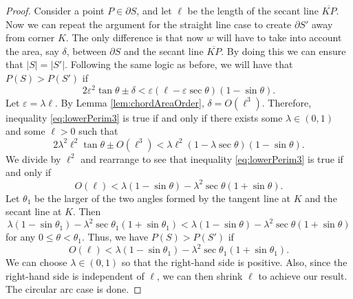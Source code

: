 \documentclass[10pt,a4paper]{amsart}
\begin{document}
\begin{proof}
    Consider a point $P \in \partial S$, and let $\ell$ be the length of the secant line $\overline{KP}$. Now we can repeat the argument for the straight line case to create $\partial S'$ away from corner $K$. The only difference is that now $w$ will have to take into account the area, say $\delta$, between $\partial S$ and the secant line $\overline{KP}$. By doing this we can ensure that $|S| = |S'|$. Following the same logic as before, we will have that $P(S) > P(S')$ if
    \begin{equation}\label{eq:lowerPerim3}
        2\varepsilon^2\tan\theta  \pm \delta < \varepsilon(\ell - \varepsilon\sec\theta)(1-\sin\theta).
    \end{equation}
    Let $\varepsilon = \lambda \ell$. By Lemma \ref{lem:chordAreaOrder}, $\delta = O(\ell^3)$. Therefore, inequality \eqref{eq:lowerPerim3} is true if and only if there exists some $\lambda \in (0,1)$ and some $\ell > 0$ such that
    \[
        2\lambda^2\ell^2\tan\theta  \pm O(\ell^3) < \lambda\ell^2(1 - \lambda\sec\theta)(1-\sin\theta).
    \]
    We divide by $\ell^2$ and rearrange to see that inequality \eqref{eq:lowerPerim3} is true if and only if
    \[
        O(\ell) < \lambda(1-\sin\theta) - \lambda^2\sec\theta(1+\sin\theta).
    \]
    Let $\theta_{1}$ be the larger of the two angles formed by the tangent line at $K$ and the secant line at $K$. Then
    \[
        \lambda(1-\sin\theta_{1}) - \lambda^2\sec\theta_{1}(1+\sin\theta_{1}) < \lambda(1-\sin\theta) - \lambda^2\sec\theta(1+\sin\theta)
    \]
 for any $0\leq \theta < \theta_1$.   Thus, we have $P(S) > P(S')$ if
    \[
        O(\ell) < \lambda(1-\sin\theta_{1}) - \lambda^2\sec\theta_{1}(1+\sin\theta_{1}).
    \]
    We can choose $\lambda \in (0,1)$ so that the right-hand side is positive. Also, since the right-hand side is independent of $\ell$, we can then shrink $\ell$ to achieve our result. The circular arc case is done.
\end{proof}
\end{document}
